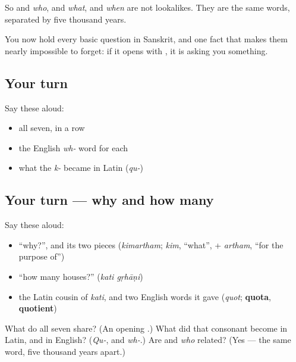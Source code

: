 So \emph{} and \emph{who}, \emph{} and \emph{what}, \emph{} and \emph{when} are not lookalikes. They are the same words, separated by five thousand years.

\begin{grammarlens}[title={What you've built}]
You now hold every basic question in Sanskrit, and one fact that makes them nearly impossible to forget: if it opens with , it is asking you something.
\end{grammarlens}

\subsection*{Your turn}
Say these aloud:

\begin{itemize}
\raggedright
  \item all seven, in a row
  \item the English \emph{wh-} word for each
  \item what the \emph{k-} became in Latin (\emph{qu-})
\end{itemize}

\subsection*{Your turn — why and how many}
Say these aloud:

\begin{itemize}
\raggedright
  \item \textquotedblleft{}why?\textquotedblright{}, and its two pieces (\emph{kimartham}; \emph{kim}, \textquotedblleft{}what\textquotedblright{}, + \emph{artham}, \textquotedblleft{}for the purpose of\textquotedblright{})
  \item \textquotedblleft{}how many houses?\textquotedblright{} (\emph{kati gṛhāṇi})
  \item the Latin cousin of \emph{kati}, and two English words it gave (\emph{quot}; \textbf{quota}, \textbf{quotient})
\end{itemize}

\begin{tcolorbox}[breakable,colback=teal!4,colframe=teal!35!black,title={Before you move on}]
What do all seven share? (An opening .) What did that consonant become in Latin, and in English? (\emph{Qu-}, and \emph{wh-}.) Are  and \emph{who} related? (Yes — the same word, five thousand years apart.)
\end{tcolorbox}
